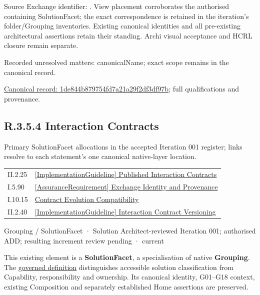 Source Exchange identifier: \texttt{}. View placement corroborates
the authorised containing SolutionFacet; the exact correspondence is retained in the
iteration's folder/Grouping inventories. Existing canonical identities and all
pre-existing architectural assertions retain their standing. Archi visual
acceptance and HCRL closure remain separate.


{\small Recorded unresolved matters: canonicalName; exact scope remains in the canonical record.}\par
{\footnotesize \href{../../../../../../../continuum/grouping/1de844b879754fd7a21a29f2df3df97b.md}{Canonical record: 1de844b879754fd7a21a29f2df3df97b}; full qualifications and provenance.}\par
\subsection*{R.3.5.4 Interaction Contracts}
\label{navigation:R.3.5.4}

Primary SolutionFacet allocations in the accepted Iteration 001 register; links resolve to each statement’s one canonical native-layer location.\par
\begin{longtable}{p{.22\linewidth}p{.73\linewidth}}
II.2.25 & \hyperref[element:b21633d8a1554688baf8704264c63608]{[ImplementationGuideline] Published Interaction Contracts} \\
I.5.90 & \hyperref[element:5579b7ce9df540359b7ba36f807b52c5]{[AssuranceRequirement] Exchange Identity and Provenance} \\
I.10.15 & \hyperref[element:0da415a142c640d9ab1c73d770df8ea3]{Contract Evolution Compatibility} \\
II.2.40 & \hyperref[element:71d7a55f3d8c4b12836601da142cb304]{[ImplementationGuideline] Interaction Contract Versioning} \\
\end{longtable}
\label{element:b3c19413e4b447adb5f1d86912db4052}
{\small Grouping / SolutionFacet · Solution Architect-reviewed Iteration 001; authorised ADD; resulting increment review pending · current}\par

This existing element is a \textbf{SolutionFacet}, a specialisation of native
\textbf{Grouping}. The \href{\detokenize{../../../../../../../governance/continuum-representation.md#solutionfacet-classification--1119-candidate}}{governed definition}
distinguishes accessible solution classification from Capability, responsibility
and ownership. Its canonical identity, G01–G18 context, existing Composition
and separately established Home assertions are preserved.



